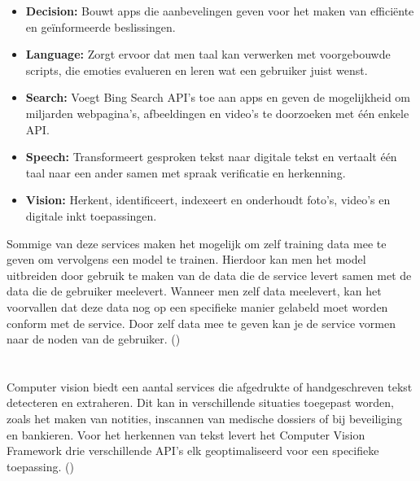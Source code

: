 \begin{itemize}
	\item \textbf{Decision:} Bouwt apps die aanbevelingen geven voor het maken van efficiënte en geïnformeerde beslissingen.
	\item \textbf{Language:} Zorgt ervoor dat men taal kan verwerken met voorgebouwde scripts, die emoties evalueren en leren wat een gebruiker juist wenst.
	\item \textbf{Search:} Voegt Bing Search API’s toe aan apps en geven de mogelijkheid om miljarden webpagina’s, afbeeldingen en video's te doorzoeken met één enkele API.
	\item \textbf{Speech:} Transformeert gesproken tekst naar digitale tekst en vertaalt één taal naar een ander samen met spraak verificatie en herkenning.
	\item \textbf{Vision:} Herkent, identificeert, indexeert en onderhoudt foto's, video's en digitale inkt toepassingen.
\end{itemize}
Sommige van deze services maken het mogelijk om zelf training data mee te geven om vervolgens een model te trainen. Hierdoor kan men het model uitbreiden door gebruik te maken van de data die de service levert samen met de data die de gebruiker meelevert. Wanneer men zelf data meelevert, kan het voorvallen dat deze data nog op een specifieke manier gelabeld moet worden conform met de service. Door zelf data mee te geven kan je de service vormen naar de noden van de gebruiker. (\cite{Microsoft2020b})



\section{}
Computer vision biedt een aantal services die afgedrukte of handgeschreven tekst detecteren en extraheren. Dit kan in verschillende situaties toegepast worden, zoals het maken van notities, inscannen van medische dossiers of bij beveiliging en bankieren. Voor het herkennen van tekst levert het Computer Vision Framework drie verschillende API’s elk geoptimaliseerd voor een specifieke toepassing. (\cite{Microsoft2020c})

